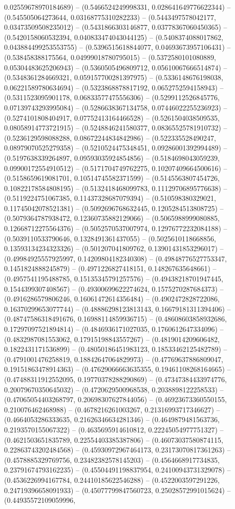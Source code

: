 0.02559678970184689) -- (0.5466524249998331, 0.028641649776622344) -- (0.545505064273644, 0.03168775310282233) -- (0.5443497578042177, 0.03473509508235012) -- (0.5431866303146877, 0.03778367060450365) -- (0.5420158060532394, 0.040833474043044125) -- (0.5408374088017862, 0.043884499253553755) -- (0.5396515618844077, 0.04693673957106431) -- (0.538458388175564, 0.04999018780795015) -- (0.5372580101080889, 0.05304483625206943) -- (0.5360505496809712, 0.05610067666514874) -- (0.5348361284669321, 0.059157700281397975) -- (0.5336148676198038, 0.06221589780634694) -- (0.5323868878817192, 0.0652752594158943) -- (0.5311523095901178, 0.06833577475556306) -- (0.5299112526845776, 0.07139743293995084) -- (0.5286638367134758, 0.07446022255236923) -- (0.5274101808404917, 0.07752413164466528) -- (0.5261504038509535, 0.08058914773721915) -- (0.5248846241580377, 0.08365525781910732) -- (0.5236129598088288, 0.08672244834842986) -- (0.522335528490247, 0.08979070525279358) -- (0.5210524475348451, 0.09286001392994489) -- (0.5197638339264897, 0.09593035924854856) -- (0.5184698043059239, 0.09900172554910512) -- (0.5171704749762275, 0.10207409664500616) -- (0.5158659619081701, 0.10514745582371599) -- (0.5145563807454726, 0.10822178584808195) -- (0.5132418468099783, 0.11129706895776638) -- (0.5119224751067385, 0.11437328687079394) -- (0.510598380329021, 0.11745042078521381) -- (0.5092696768632445, 0.1205284513808725) -- (0.5079364787938472, 0.12360735882129066) -- (0.5065988999080885, 0.12668712275564376) -- (0.5052570537007974, 0.12976772232084188) -- (0.5039110533790646, 0.1328491361437055) -- (0.5025610118668856, 0.13593134234323326) -- (0.501207041809762, 0.13901431853296017) -- (0.49984925557925997, 0.14209804182340308) -- (0.49848776527753347, 0.1451824888245879) -- (0.4971226827418151, 0.148267635648661) -- (0.4957541195488785, 0.15135345791257576) -- (0.49438218701947445, 0.1544399307408567) -- (0.49300699622274624, 0.1575270287684373) -- (0.4916286579806246, 0.16061472614356484) -- (0.4902472828722086, 0.16370299653077744) -- (0.48886298123813143, 0.16679181311394406) -- (0.48747586318491676, 0.16988114859936715) -- (0.48608603858932686, 0.17297097521894814) -- (0.4846936171027035, 0.1760612647334096) -- (0.4832987081553062, 0.17915198843557267) -- (0.4819014209606482, 0.1822431171536899) -- (0.48050186451983123, 0.18533462125482789) -- (0.4791001476258819, 0.18842647064829973) -- (0.47769637886809047, 0.19151863478914363) -- (0.47629066663635355, 0.19461108268164665) -- (0.47488311912552095, 0.19770378288290869) -- (0.47347384433974776, 0.20079670350645032) -- (0.4720629500968538, 0.2038898122258533) -- (0.47065054403268797, 0.20698307627844056) -- (0.46923673360550155, 0.210076462468988) -- (0.4678216261003267, 0.21316993717346627) -- (0.4664053286333635, 0.21626346634281346) -- (0.4649879481563736, 0.2193570155067322) -- (0.4635695914610812, 0.22245054977751327) -- (0.4621503651835789, 0.22554403385387806) -- (0.46073037580874115, 0.22863743202484568) -- (0.45930972967464173, 0.23173070817361263) -- (0.4578885329769756, 0.23482382578145203) -- (0.4564668917734835, 0.23791674793162235) -- (0.45504491198837954, 0.24100943731329078) -- (0.4536226994167784, 0.24410185622546288) -- (0.4522003597291226, 0.24719396658091933) -- (0.45077799847560723, 0.25028572991015624) -- (0.44935572109059996, 